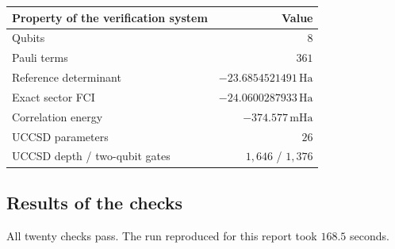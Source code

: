 \documentclass[11pt,a4paper]{article}
\newcommand{\mHa}{\ensuremath{\,\mathrm{mHa}}}
\newcommand{\Ha}{\ensuremath{\,\mathrm{Ha}}}
\begin{document}
\begin{center}
\small
\begin{tabular}{lr}
\toprule
Property of the verification system & Value \\
\midrule
Qubits                        & $8$ \\
Pauli terms                   & $361$ \\
Reference determinant         & $-23.6854521491\Ha$ \\
Exact sector FCI              & $-24.0600287933\Ha$ \\
Correlation energy            & $-374.577\mHa$ \\
UCCSD parameters              & $26$ \\
UCCSD depth / two-qubit gates & $1{,}646$ / $1{,}376$ \\
\bottomrule
\end{tabular}
\end{center}

\subsection{Results of the checks}

All twenty checks pass. The run reproduced for this report took $168.5$ seconds.
\end{document}
